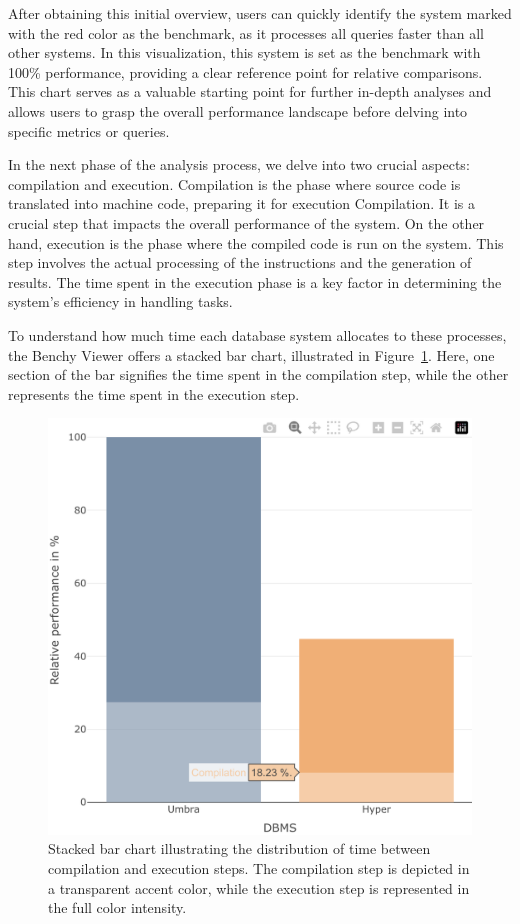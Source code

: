 After obtaining this initial overview, users can quickly identify the system marked with the red color as the benchmark, as it processes all queries faster than all other systems. In this visualization, this system is set as the benchmark with 100\% performance, providing a clear reference point for relative comparisons.\\
This chart serves as a valuable starting point for further in-depth analyses and allows users to grasp the overall performance landscape before delving into specific metrics or queries.

In the next phase of the analysis process, we delve into two crucial aspects: compilation and execution. Compilation is the phase where source code is translated into machine code, preparing it for execution Compilation. It is a crucial step that impacts the overall performance of the system. On the other hand, execution is the phase where the compiled code is run on the system. This step involves the actual processing of the instructions and the generation of results. The time spent in the execution phase is a key factor in determining the system's efficiency in handling tasks.

To understand how much time each database system allocates to these processes, the Benchy Viewer offers a stacked bar chart, illustrated in Figure~\ref{fig:execution-compilation}. Here, one section of the bar signifies the time spent in the compilation step, while the other represents the time spent in the execution step.

\begin{figure}[h]
  \centering
  \includegraphics[width=0.5\linewidth]{figures/bsp-compilation-execution.png}
  \caption{Stacked bar chart illustrating the distribution of time between compilation and execution steps. The compilation step is depicted in a transparent accent color, while the execution step is represented in the full color intensity.}
  \label{fig:execution-compilation}
\end{figure}

